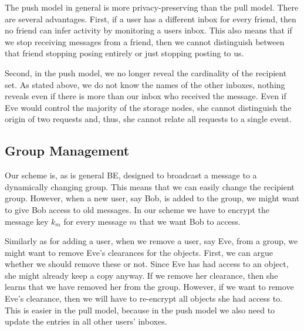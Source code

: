 The push model in general is more privacy-preserving than the pull model.
There are several advantages.
First, if a user has a different inbox for every friend, then no friend can 
infer activity by monitoring a users inbox.
This also means that if we stop receiving messages from a friend, then we 
cannot distinguish between that friend stopping posing entirely or just 
stopping posting to us.

Second, in the push model, we no longer reveal the cardinality of the recipient 
set.
As stated above, we do not know the names of the other inboxes, nothing reveals 
even if there is more than our inbox who received the message.
Even if Eve would control the majority of the storage nodes, she cannot 
distinguish the origin of two requests and, thus, she cannot relate all 
requests to a single event.

\subsection{Group Management}\label{sec:GroupManagement}

Our scheme is, as is general \ac{BE}, designed to broadcast a message to 
a dynamically changing group.
This means that we can easily change the recipient group.
However, when a new user, say Bob, is added to the group, we might want to give 
Bob access to old messages.
In our scheme we have to encrypt the message key \(k_m\) for every message 
\(m\) that we want Bob to access.

Similarly as for adding a user, when we remove a user, say Eve, from a group, 
we might want to remove Eve's clearances for the objects.
First, we can argue whether we should remove these or not.
Since Eve has had access to an object, she might already keep a copy anyway.
If we remove her clearance, then she learns that we have removed her from the 
group.
However, if we want to remove Eve's clearance, then we will have to re-encrypt 
all objects she had access to.
This is easier in the pull model, because in the push model we also need to 
update the entries in all other users' inboxes.




